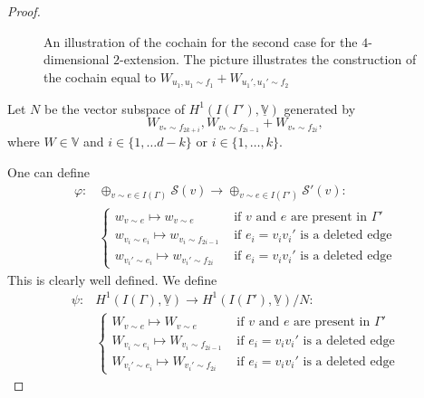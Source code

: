 \documentclass{article}
\theoremstyle{definition}
\theoremstyle{remark}
\begin{document}
\begin{proof}
\begin{figure}[h!]
\caption{An illustration of the cochain for the second case for the $4$-dimensional $2$-extension. The picture illustrates the construction of the cochain equal to $W_{u_1, u_1 \sim f_1} + W_{u_1', u_1' \sim f_2} $}
\label{fig: proof_case_2_bis}
\end{figure}

Let $N$ be the vector subspace of $H^{1}(I(\Gamma'), \underline{\mathbb{V}})$ generated by 
\begin{equation*}
    W_{v_{*} \sim f_{2k+i}}, W_{v_* \sim f_{2i -1}} + W_{v_* \sim f_{2i}},
\end{equation*}
  where $W\in \mathbb{V}$ and $i\in \{1, \dots d-k\}$ or $i\in \{1, \dots, k\}$.

One can define 
\begin{equation*}
\begin{array}{cl}
   \varphi: & \oplus_{v\sim e\in I(\Gamma)}  \mathcal{S}(v) \rightarrow \oplus_{v\sim e\in I(\Gamma')} \mathcal{S}'(v):\\
   &\begin{cases}
    w_{v \sim e} \mapsto w_{v \sim e} &\text{ if $v$ and $e$ are present in $\Gamma'$}\\
    w_{v_i \sim e_i} \mapsto w_{ v_i \sim f_{2i-1}} &\text{ if $e_i=v_iv_{i}'$ is a deleted edge}\\
    w_{v_{i}' \sim e_i} \mapsto w_{ v_{i}' \sim f_{2i}} &\text{ if $e_i=v_iv_{i}'$ is a deleted edge}
   \end{cases}
\end{array}
\end{equation*}
This is clearly well defined. We define
\begin{equation*}
\begin{array}{cl}
   \psi: & H^{1}(I(\Gamma), \underline{\mathbb{V}}) \rightarrow H^{1}(I(\Gamma'), \underline{\mathbb{V}})/N:\\
   &\begin{cases}
    W_{v \sim e} \mapsto W_{v \sim e} &\text{ if $v$ and $e$ are present in $\Gamma'$}\\
    W_{v_i \sim e_i} \mapsto W_{v_i \sim f_{2i-1}} &\text{ if $e_i=v_iv_{i}'$ is a deleted edge}\\
    W_{v_{i}' \sim e_i} \mapsto W_{v_{i}'\sim f_{2i}} &\text{ if $e_i=v_iv_{i}'$ is a deleted edge}
   \end{cases}
\end{array}
\end{equation*}


\end{proof}
\end{document}
